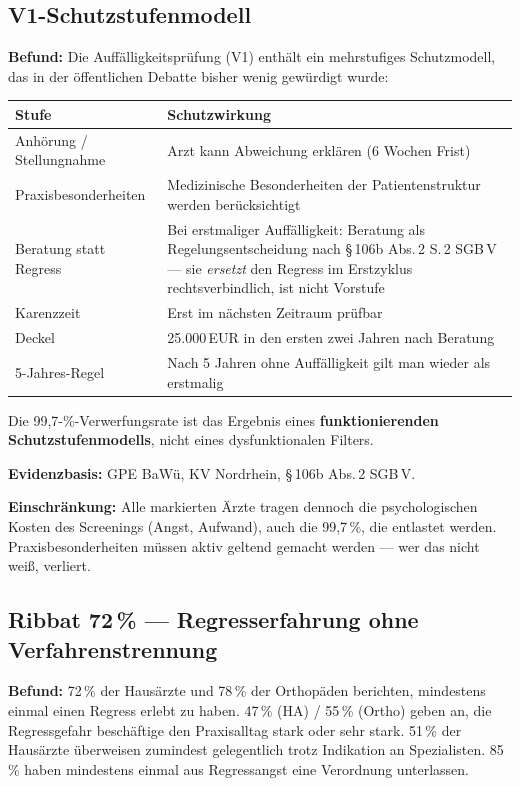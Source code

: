 \documentclass{umbruch-position}
\begin{document}
\subsection{V1-Schutzstufenmodell}

\textbf{Befund:} Die Auff\"alligkeitspr\"ufung (V1) enth\"alt ein mehrstufiges Schutzmodell, das in der \"offentlichen Debatte bisher wenig gew\"urdigt wurde:

\smallskip
{\small
\begin{tabularx}{\textwidth}{lX}
\hline
\textbf{Stufe} & \textbf{Schutzwirkung} \\
\hline
Anh\"orung / Stellungnahme & Arzt kann Abweichung erkl\"aren (6 Wochen Frist) \\
Praxisbesonderheiten & Medizinische Besonderheiten der Patientenstruktur werden ber\"ucksichtigt \\
Beratung statt Regress & Bei erstmaliger Auff\"alligkeit: Beratung als Regelungsentscheidung nach \S\,106b Abs.\,2 S.\,2 SGB\,V --- sie \emph{ersetzt} den Regress im Erstzyklus rechtsverbindlich, ist nicht Vorstufe \\
Karenzzeit & Erst im n\"achsten Zeitraum pr\"ufbar \\
Deckel & 25.000\,EUR in den ersten zwei Jahren nach Beratung \\
5-Jahres-Regel & Nach 5 Jahren ohne Auff\"alligkeit gilt man wieder als erstmalig \\
\hline
\end{tabularx}
}
\smallskip

Die 99,7-\%-Verwerfungsrate ist das Ergebnis eines \textbf{funktionierenden Schutzstufenmodells}, nicht eines dysfunktionalen Filters.

\textbf{Evidenzbasis:} GPE BaW\"u, KV Nordrhein, \S\,106b Abs.\,2 SGB\,V.

\textbf{Einschr\"ankung:} Alle markierten \"Arzte tragen dennoch die psychologischen Kosten des Screenings (Angst, Aufwand), auch die 99,7\,\%, die entlastet werden. Praxisbesonderheiten m\"ussen aktiv geltend gemacht werden --- wer das nicht wei\ss{}, verliert.

\subsection{Ribbat 72\,\% --- Regresserfahrung ohne Verfahrenstrennung}

\textbf{Befund:} 72\,\% der Haus\"arzte und 78\,\% der Orthop\"aden berichten, mindestens einmal einen Regress erlebt zu haben. 47\,\% (HA) / 55\,\% (Ortho) geben an, die Regressgefahr besch\"aftige den Praxisalltag \glqq{}stark oder sehr stark\grqq{}. 51\,\% der Haus\"arzte \"uberweisen \glqq{}zumindest gelegentlich trotz Indikation\grqq{} an Spezialisten. 85\,\% haben mindestens einmal aus Regressangst eine Verordnung unterlassen.
\end{document}
